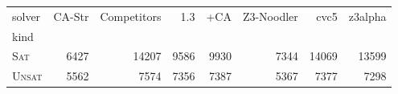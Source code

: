 \begin{tabular}{lrrrrrrr}
\toprule
solver & CA-Str & Competitors & \Ostrich{} 1.3 & \Ostrich{}+CA & Z3-Noodler & cvc5 & z3alpha \\
kind &  &  &  &  &  &  &  \\
\midrule
\textsc{Sat} & 6427 & 14207 & 9586 & 9930 & 7344 & 14069 & 13599 \\
\textsc{Unsat} & 5562 & 7574 & 7356 & 7387 & 5367 & 7377 & 7298 \\
\bottomrule
\end{tabular}
